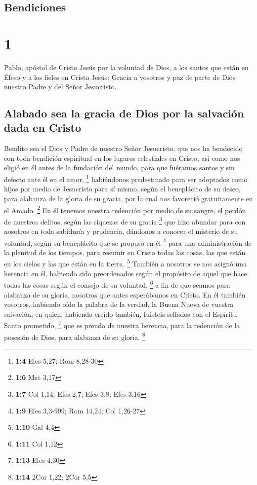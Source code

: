 \hypertarget{bendiciones}{%
\subsection{Bendiciones}\label{bendiciones}}

\hypertarget{section}{%
\section{1}\label{section}}

 Pablo, apóstol de Cristo Jesús por la voluntad de Dios, a
los santos que están en Éfeso y a los fieles en Cristo Jesús:
 Gracia a vosotros y paz de parte de Dios nuestro Padre y
del Señor Jesucristo.

\hypertarget{alabado-sea-la-gracia-de-dios-por-la-salvaciuxf3n-dada-en-cristo}{%
\subsection{Alabado sea la gracia de Dios por la salvación dada en
Cristo}\label{alabado-sea-la-gracia-de-dios-por-la-salvaciuxf3n-dada-en-cristo}}

 Bendito sea el Dios y Padre de nuestro Señor Jesucristo,
que nos ha bendecido con toda bendición espiritual en los lugares
celestiales en Cristo,  así como nos eligió en él antes de
la fundación del mundo, para que fuéramos santos y sin defecto ante él
en el amor, \footnote{\textbf{1:4} Efes 5,27; Rom 8,28-30}
 habiéndonos predestinado para ser adoptados como hijos
por medio de Jesucristo para sí mismo, según el beneplácito de su deseo,
 para alabanza de la gloria de su gracia, por la cual nos
favoreció gratuitamente en el Amado. \footnote{\textbf{1:6} Mat 3,17}
 En él tenemos nuestra redención por medio de su sangre,
el perdón de nuestros delitos, según las riquezas de su gracia
\footnote{\textbf{1:7} Col 1,14; Efes 2,7; Efes 3,8; Efes 3,16}
 que hizo abundar para con nosotros en toda sabiduría y
prudencia,  dándonos a conocer el misterio de su voluntad,
según su beneplácito que se propuso en él \footnote{\textbf{1:9} Efes
  3,3-999; Rom 14,24; Col 1,26-27}  para una
administración de la plenitud de los tiempos, para resumir en Cristo
todas las cosas, las que están en los cielos y las que están en la
tierra. \footnote{\textbf{1:10} Gal 4,4}  También a
nosotros se nos asignó una herencia en él, habiendo sido preordenados
según el propósito de aquel que hace todas las cosas según el consejo de
su voluntad, \footnote{\textbf{1:11} Col 1,12}  a fin de
que seamos para alabanza de su gloria, nosotros que antes esperábamos en
Cristo.  En él también vosotros, habiendo oído la palabra
de la verdad, la Buena Nueva de vuestra salvación, en quien, habiendo
creído también, fuisteis sellados con el Espíritu Santo prometido,
\footnote{\textbf{1:13} Efes 4,30}  que es prenda de
nuestra herencia, para la redención de la posesión de Dios, para
alabanza de su gloria. \footnote{\textbf{1:14} 2Cor 1,22; 2Cor 5,5}

